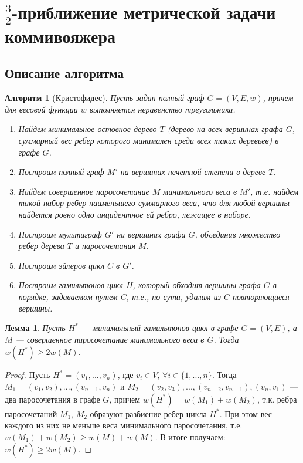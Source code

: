 \documentclass[a4paper]{article}
\newtheorem{lemma}{Лемма}
\newtheorem{algorithm}{Алгоритм}
\begin{document}
\bigskip

\section{$\frac{3}{2}$-приближение метрической задачи коммивояжера}
\subsection{Описание алгоритма}
\begin{algorithm}[Кристофидес]
    Пусть задан полный граф $G=(V,E,w)$, причем для весовой функции $w$ выполняется неравенство треугольника.\\
    \begin{enumerate}
        \item Найдем минимальное остовное дерево $T$ (дерево на всех вершинах графа $G$, суммарный вес ребер которого минимален среди всех таких деревьев) в графе $G$.
        \item Построим полный граф $M'$ на вершинах нечетной степени в дереве $T$.
        \item Найдем совершенное паросочетание $M$ минимального веса в $M'$, т.е. найдем такой набор ребер наименьшего суммарного веса, что для любой вершины найдется ровно одно инцидентное ей ребро, лежащее в наборе.
        \item Построим мультиграф $G'$ на вершинах графа $G$, объединив множество ребер дерева $T$ и паросочетания $M$.
        \item Построим эйлеров цикл $C$ в $G'$.
        \item Построим гамильтонов цикл $H$, который обходит вершины графа $G$ в порядке, задаваемом путем $C$, т.е., по сути, удалим из $C$ повторяющиеся вершины.
    \end{enumerate}\cite{kormen}
\end{algorithm}

\begin{lemma}
    Пусть $H^*$ --- минимальный гамильтонов цикл в графе $G=(V,E)$, а $M$ --- совершенное паросочетание минимального веса в $G$. Тогда $w(H^*) \ge 2w(M)$.
\end{lemma}
\begin{proof}
    Пусть $H^*=(v_1, ...,v_n)$, где $v_i\in V,\, \forall i \in \{1,...,n\}$. Тогда $M_1={(v_1, v_2),..., (v_{n-1}, v_{n})}$ и $M_2={(v_2, v_3),..., (v_{n-2}, v_{n-1}), (v_{n}, v_{1})}$ --- два паросочетания в графе $G$, причем $w(H^*) = w(M_1) + w(M_2)$, т.к. ребра паросочетаний $M_1$, $M_2$ образуют разбиение ребер цикла $H^*$. При этом вес каждого из них не меньше веса минимального паросочетания, т.е. $w(M_1) + w(M_2) \ge w(M) + w(M)$. В итоге получаем: $w(H^*) \ge 2w(M)$.
\end{proof}
\end{document}
